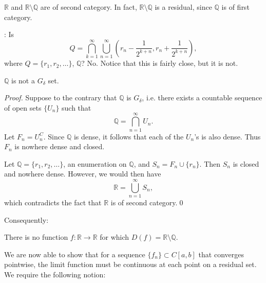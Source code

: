 \documentclass[notoc,notitlepage]{tufte-book}
\begin{document}
\begin{eg}
  $\mathbb{R}$ and $\mathbb{R} \setminus \mathbb{Q}$ are of second category. In fact, $\mathbb{R} \setminus \mathbb{Q}$ is a residual, since $\mathbb{Q}$ is of first category.
\end{eg}

: Is
\begin{equation*}
  Q = \bigcap_{k=1}^{\infty} \bigcup_{n=1}^{\infty} \left( r_n - \frac{1}{2^{k + n}}, r_n + \frac{1}{2^{k + n}} \right),
\end{equation*}
where $Q = \{ r_1, r_2, \ldots \}$, $\mathbb{Q}$? No. Notice that this is fairly close, but it is not.

\begin{crly}\label{crly:_q_is_not_g_delta_}
  $\mathbb{Q}$ is not a $G_\delta$ set.
\end{crly}

\begin{proof}
  Suppose to the contrary that $\mathbb{Q}$ is $G_\delta$, i.e. there exists a countable sequence of open sets $\{ U_n \}$ such that
  \begin{equation*}
    \mathbb{Q} = \bigcap_{n=1}^{\infty} U_n.
  \end{equation*}
  Let $F_n = U_n^C$. Since $\mathbb{Q}$ is dense, it follows that each of the $U_n$'s is also dense. Thus $F_n$ is nowhere dense and closed.

  Let $\mathbb{Q} = \{ r_1, r_2, \ldots \}$, an enumeration on $\mathbb{Q}$, and $S_n = F_n \cup \{ r_n \}$. Then $S_n$ is closed and nowhere dense. However, we would then have
  \begin{equation*}
    \mathbb{R} = \bigcup_{n=1}^{\infty} S_n,
  \end{equation*}
  which contradicts the fact that $\mathbb{R}$ is of second category.\qed\
\end{proof}

Consequently:

\begin{crly}\label{crly:there_are_no_functions_discontinuous_on_all_irrational_numbers}
  There is no function $f : \mathbb{R} \to \mathbb{R}$ for which $D(f) = \mathbb{R} \setminus \mathbb{Q}$.
\end{crly}

We are now able to show that for a sequence $\{ f_n \} \subset C[a, b]$ that converges pointwise, the limit function must be continuous at each point on a residual set. We require the following notion:
\end{document}
